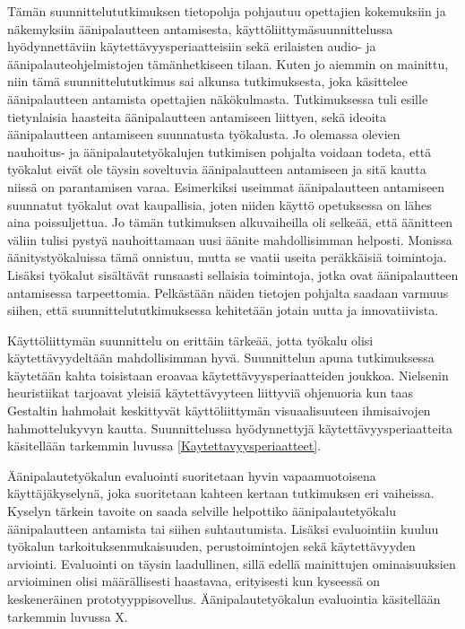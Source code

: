 \documentclass[utf8]{gradu3}
\begin{document}
Tämän suunnittelututkimuksen tietopohja pohjautuu opettajien kokemuksiin ja näkemyksiin äänipalautteen antamisesta, käyttöliittymäsuunnittelussa hyödynnettäviin käytettävyysperiaatteisiin sekä erilaisten audio- ja äänipalauteohjelmistojen tämänhetkiseen tilaan.  Kuten jo aiemmin on mainittu, niin tämä suunnittelututkimus sai alkunsa tutkimuksesta, joka käsittelee äänipalautteen antamista opettajien näkökulmasta. Tutkimuksessa tuli esille tietynlaisia haasteita äänipalautteen antamiseen liittyen, sekä ideoita äänipalautteen antamiseen suunnatusta työkalusta. Jo olemassa olevien nauhoitus- ja äänipalautetyökalujen tutkimisen pohjalta voidaan todeta, että työkalut eivät ole täysin soveltuvia äänipalautteen antamiseen ja sitä kautta niissä on parantamisen varaa. Esimerkiksi useimmat äänipalautteen antamiseen suunnatut työkalut ovat kaupallisia, joten niiden käyttö opetuksessa on lähes aina poissuljettua. Jo tämän tutkimuksen alkuvaiheilla oli selkeää, että äänitteen väliin tulisi pystyä nauhoittamaan uusi äänite mahdollisimman helposti. Monissa äänitystyökaluissa tämä onnistuu, mutta se vaatii useita peräkkäisiä toimintoja. Lisäksi työkalut sisältävät runsaasti sellaisia toimintoja, jotka ovat äänipalautteen antamisessa tarpeettomia. Pelkästään näiden tietojen pohjalta saadaan varmuus siihen, että suunnittelututkimuksessa kehitetään jotain uutta ja innovatiivista.

Käyttöliittymän suunnittelu on erittäin tärkeää, jotta työkalu olisi käytettävyydeltään mahdollisimman hyvä. Suunnittelun apuna tutkimuksessa käytetään kahta toisistaan eroavaa käytettävyysperiaatteiden joukkoa. Nielsenin heuristiikat tarjoavat yleisiä käytettävyyteen liittyviä ohjenuoria kun taas Gestaltin hahmolait keskittyvät käyttöliittymän visuaalisuuteen ihmisaivojen hahmottelukyvyn kautta. Suunnittelussa hyödynnettyjä käytettävyysperiaatteita käsitellään tarkemmin luvussa \ref{Kaytettavyysperiaatteet}.

Äänipalautetyökalun evaluointi suoritetaan hyvin vapaamuotoisena käyttäjäkyselynä, joka suoritetaan kahteen kertaan tutkimuksen eri vaiheissa. Kyselyn tärkein tavoite on saada selville helpottiko äänipalautetyökalu äänipalautteen antamista tai siihen suhtautumista. Lisäksi evaluointiin kuuluu työkalun tarkoituksenmukaisuuden, perustoimintojen sekä käytettävyyden arviointi. Evaluointi on täysin laadullinen, sillä edellä mainittujen ominaisuuksien arvioiminen olisi määrällisesti haastavaa, erityisesti kun kyseessä on keskeneräinen prototyyppisovellus. Äänipalautetyökalun evaluointia käsitellään tarkemmin luvussa X.
\end{document}
